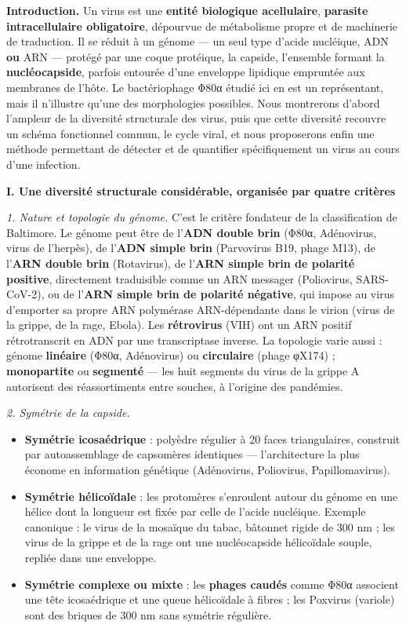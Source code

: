 \documentclass[11pt,a4paper]{article}
\providecommand{\tightlist}{\setlength{\itemsep}{0pt}\setlength{\parskip}{0pt}}
\begin{document}
\textbf{Introduction.} Un virus est une \textbf{entité biologique acellulaire}, \textbf{parasite intracellulaire obligatoire}, dépourvue de métabolisme propre et de machinerie de traduction. Il se réduit à un génome --- un seul type d'acide nucléique, ADN \textbf{ou} ARN --- protégé par une coque protéique, la capside, l'ensemble formant la \textbf{nucléocapside}, parfois entourée d'une enveloppe lipidique empruntée aux membranes de l'hôte. Le bactériophage Φ80α étudié ici en est un représentant, mais il n'illustre qu'une des morphologies possibles. Nous montrerons d'abord l'ampleur de la diversité structurale des virus, puis que cette diversité recouvre un schéma fonctionnel commun, le cycle viral, et nous proposerons enfin une méthode permettant de détecter et de quantifier spécifiquement un virus au cours d'une infection.

\textbf{I. Une diversité structurale considérable, organisée par quatre critères}

\emph{1. Nature et topologie du génome.} C'est le critère fondateur de la classification de Baltimore. Le génome peut être de l'\textbf{ADN double brin} (Φ80α, Adénovirus, virus de l'herpès), de l'\textbf{ADN simple brin} (Parvovirus B19, phage M13), de l'\textbf{ARN double brin} (Rotavirus), de l'\textbf{ARN simple brin de polarité positive}, directement traduisible comme un ARN messager (Poliovirus, SARS-CoV-2), ou de l'\textbf{ARN simple brin de polarité négative}, qui impose au virus d'emporter sa propre ARN polymérase ARN-dépendante dans le virion (virus de la grippe, de la rage, Ebola). Les \textbf{rétrovirus} (VIH) ont un ARN positif rétrotranscrit en ADN par une transcriptase inverse. La topologie varie aussi : génome \textbf{linéaire} (Φ80α, Adénovirus) ou \textbf{circulaire} (phage φX174) ; \textbf{monopartite} ou \textbf{segmenté} --- les huit segments du virus de la grippe A autorisent des réassortiments entre souches, à l'origine des pandémies.

\emph{2. Symétrie de la capside.}

\begin{itemize}
\tightlist
\item
  \textbf{Symétrie icosaédrique} : polyèdre régulier à 20 faces triangulaires, construit par autoassemblage de capsomères identiques --- l'architecture la plus économe en information génétique (Adénovirus, Poliovirus, Papillomavirus).
\item
  \textbf{Symétrie hélicoïdale} : les protomères s'enroulent autour du génome en une hélice dont la longueur est fixée par celle de l'acide nucléique. Exemple canonique : le virus de la mosaïque du tabac, bâtonnet rigide de 300 nm ; les virus de la grippe et de la rage ont une nucléocapside hélicoïdale souple, repliée dans une enveloppe.
\item
  \textbf{Symétrie complexe ou mixte} : les \textbf{phages caudés} comme Φ80α associent une tête icosaédrique et une queue hélicoïdale à fibres ; les Poxvirus (variole) sont des briques de 300 nm sans symétrie régulière.
\end{itemize}
\end{document}
